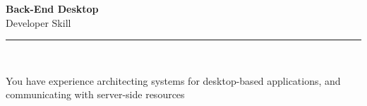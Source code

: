 \documentclass[11pt,a4paper]{memoir}
\begin{document}
    \begin{Spacing}{0.75}%
        \noindent
        \Large
        \textbf{Back-End Desktop}\\[3pt]
        \scriptsize\color{gray}Developer Skill\\ 
        \rule{\textwidth}{.3mm}\\
        
        \vspace{3mm}
        \noindent
        \begin{minipage}[t]{53mm}
            \begin{flushleft}
            {
                \normalsize
                \begin{Spacing}{1}%
                \color{black}\textrm{You have experience architecting systems for desktop-based applications, and communicating with server-side resources}\\
                \end{Spacing}
            }
            \end{flushleft}
        \end{minipage}

        \vspace{5mm}
        \noindent
        \begin{minipage}[t]{53mm}
            \begin{flushleft}
            {
                \normalsize
                \begin{Spacing}{1}%
                \color{gray}\textit{}\\
                \end{Spacing}
            }
            \end{flushleft}
        \end{minipage}
    \end{Spacing}
    \clearpage
\end{document}
